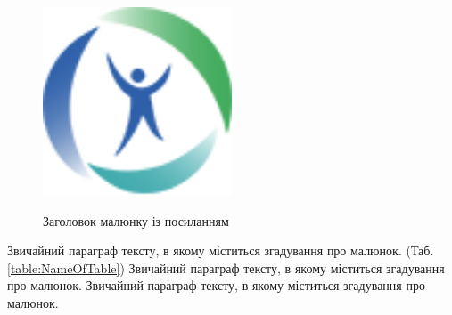 \begin{figure}[h]
\caption{Заголовок малюнку із посиланням \cite{Chen2019}}
\centering
\includegraphics[width=0.5\textwidth]{Illustrations/Logo.png}
\label{fig:NameOfPicture} %
\end{figure}

Звичайний параграф тексту, в якому міститься згадування про малюнок. (Таб. \ref{table:NameOfTable}) %
Звичайний параграф тексту, в якому міститься згадування про малюнок. Звичайний параграф тексту, в якому міститься згадування про малюнок. 



\begin{table}[]
\caption{Table to test captions and labels.\cite{Chen2019}}
\label{table:NameOfTable}
\end{table}



